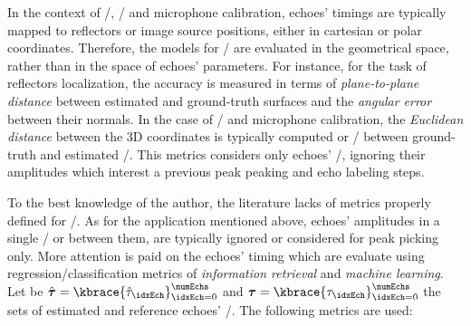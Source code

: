 \mynewline
In the context of \RooGE/, \SSL/ and microphone calibration, echoes' timings are typically mapped to reflectors or image source positions, either in cartesian or polar coordinates.
Therefore, the models for \AER/ are evaluated in the geometrical space, rather than in the space of echoes' parameters.
For instance, for the task of reflectors localization, the accuracy is measured in terms of \textit{plane-to-plane distance} between estimated and ground-truth surfaces and the \textit{angular error} between their normals.
In the case of \SSL/ and microphone calibration, the \textit{Euclidean distance} between the 3D coordinates is typically computed or \RMSE/ between ground-truth and estimated \DOAs/.
This metrics considers only echoes' \TOA/, ignoring their amplitudes which interest a previous peak peaking and echo labeling steps.

\mynewline
To the best knowledge of the author, the literature lacks of metrics properly defined for \AER/.
As for the application mentioned above, echoes' amplitudes in a single \RIR/ or between them, are typically ignored or considered for peak picking only.
More attention is paid on the echoes' timing which are evaluate using regression/classification metrics of \textit{information retrieval} and \textit{machine learning}.
\\Let be $\hat{\boldsymbol{\tau}} = \kbrace{\hat{\tau}_\idxEch}_{\idxEch=0}^{\numEchs}$ and $\boldsymbol{\tau} = \kbrace{\tau_\idxEch}_{\idxEch=0}^{\numEchs}$ the sets of estimated and reference echoes' \TOAs/.
The following metrics are used:

